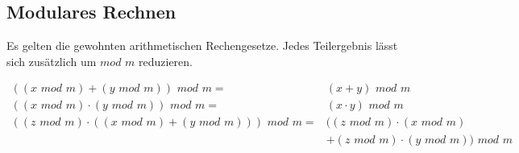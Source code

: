 \subsection{Modulares Rechnen}
Es gelten die gewohnten arithmetischen Rechengesetze. Jedes Teilergebnis lässt sich zusätzlich um $ mod \hspace{4pt} m$ reduzieren.

\begin{align*}
((x \hspace{4pt} mod \hspace{4pt} m) + (y \hspace{4pt} mod \hspace{4pt} m)) \hspace{4pt} mod \hspace{4pt}  m =& (x+y) \hspace{4pt} mod \hspace{4pt} m \\
((x \hspace{4pt} mod \hspace{4pt} m) \cdot (y \hspace{4pt} mod \hspace{4pt} m)) \hspace{4pt} mod \hspace{4pt}  m =& (x \cdot y) \hspace{4pt} mod \hspace{4pt} m \\
((z \hspace{4pt} mod \hspace{4pt} m) \cdot ((x \hspace{4pt} mod \hspace{4pt} m) + (y \hspace{4pt} mod \hspace{4pt} m))) \hspace{4pt} mod \hspace{4pt} m =& ((z \hspace{4pt} mod \hspace{4pt} m) \cdot (x \hspace{4pt} mod \hspace{4pt} m) \\
&+ (z \hspace{4pt} mod \hspace{4pt} m) \cdot (y \hspace{4pt} mod \hspace{4pt} m)) \hspace{4pt} mod \hspace{4pt} m \\ 
\end{align*}

